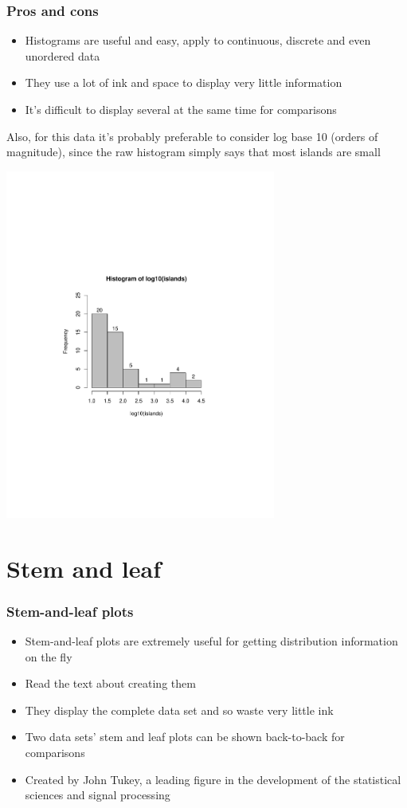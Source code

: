 \documentclass[aspectratio=169]{beamer}
\begin{document}
\begin{frame}\frametitle{Pros and cons}
\begin{itemize}
\item Histograms are useful and easy, apply to continuous, discrete and even
  unordered data
\item They use a lot of ink and space to display very little information
\item It's difficult to display several at the same time for comparisons
\end{itemize}
Also, for this data it's probably preferable to consider log base 10
(orders of magnitude), since the raw histogram simply says that most
islands are small 
\end{frame}


\begin{frame}
\includegraphics[width=3.5in]{histLog10.pdf}
\end{frame}

\section{Stem and leaf}
\begin{frame}\frametitle{Stem-and-leaf plots}
\begin{itemize}
\item Stem-and-leaf plots are extremely useful for getting
  distribution information on the fly
\item Read the text about creating them
\item They display the complete data set and so waste very little ink
\item Two data sets' stem and leaf plots can be shown back-to-back for
  comparisons
\item Created by John Tukey, a leading figure in the development of
  the statistical sciences and signal processing
\end{itemize}
\end{frame}
\end{document}

